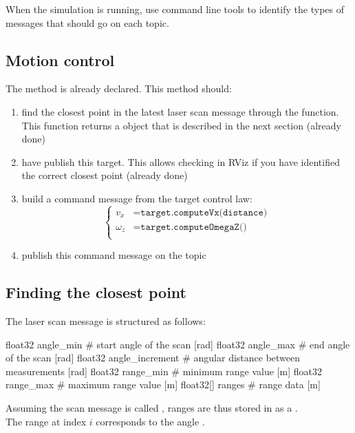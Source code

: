 \documentclass{ecnreport}
\begin{document}
When the simulation is running, use command line tools to identify the types of messages that should go on each topic.


\subsection{Motion control}

The  method is already declared. This method should:
\begin{enumerate}
 \item find the closest point in the latest laser scan message through the  function. This function returns a  object that is described in the next section (already done)
 \item have  publish this target. This allows checking in RViz if you have identified the correct closest point (already done)
 \item build a command message from the target control law:
 \begin{equation*}\left\{\begin{array}{ll}
                          v_x &= \texttt{target.computeVx(distance)}\\
                          \omega_z &= \texttt{target.computeOmegaZ()}\\
                         \end{array}\right.
 \end{equation*}
 \item publish this command message on the  topic
\end{enumerate}

\subsection{Finding the closest point}

The laser scan message is structured as follows:
\begin{bashcode}
float32 angle_min            # start angle of the scan [rad]
float32 angle_max            # end angle of the scan [rad]
float32 angle_increment      # angular distance between measurements [rad]
float32 range_min            # minimum range value [m]
float32 range_max            # maximum range value [m]
float32[] ranges             # range data [m]
\end{bashcode}

Assuming the scan message is called , ranges are thus stored in  as a .\\
The range at index $i$ corresponds to the angle .\\
\end{document}
